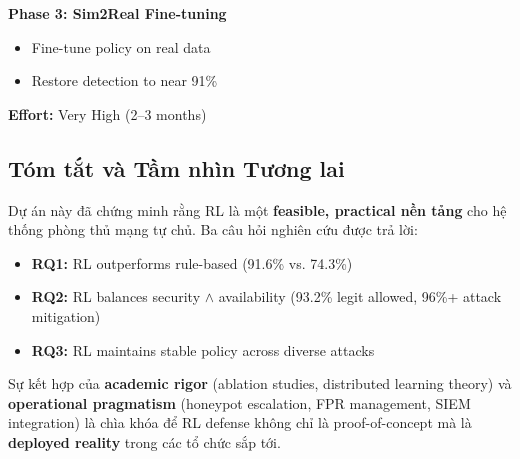 \documentclass[12pt,a4paper,twoside]{report}
\begin{document}
\textbf{Phase 3: Sim2Real Fine-tuning}
\begin{itemize}
\item Fine-tune policy on real data
\item Restore detection to near 91\%
\end{itemize}

\textbf{Effort:} Very High (2--3 months)

\subsection{Tóm tắt và Tầm nhìn Tương lai}

Dự án này đã chứng minh rằng RL là một \textbf{feasible, practical nền tảng} cho hệ thống phòng thủ mạng tự chủ. Ba câu hỏi nghiên cứu được trả lời:
\begin{itemize}
\item \textbf{RQ1:} RL outperforms rule-based (91.6\% vs. 74.3\%)
\item \textbf{RQ2:} RL balances security $\land$ availability (93.2\% legit allowed, 96\%+ attack mitigation)
\item \textbf{RQ3:} RL maintains stable policy across diverse attacks
\end{itemize}

Sự kết hợp của \textbf{academic rigor} (ablation studies, distributed learning theory) và \textbf{operational pragmatism} (honeypot escalation, FPR management, SIEM integration) là chìa khóa để RL defense không chỉ là proof-of-concept mà là \textbf{deployed reality} trong các tổ chức sắp tới.
\end{document}
